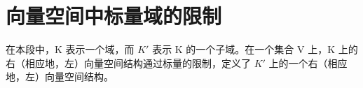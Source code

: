 \section{向量空间中标量域的限制}

在本段中，K 表示一个域，而 \(K'\) 表示 K 的一个子域。在一个集合 V 上，K 上的右（相应地，左）向量空间结构通过标量的限制，定义了 \(K'\) 上的一个右（相应地，左）向量空间结构。

